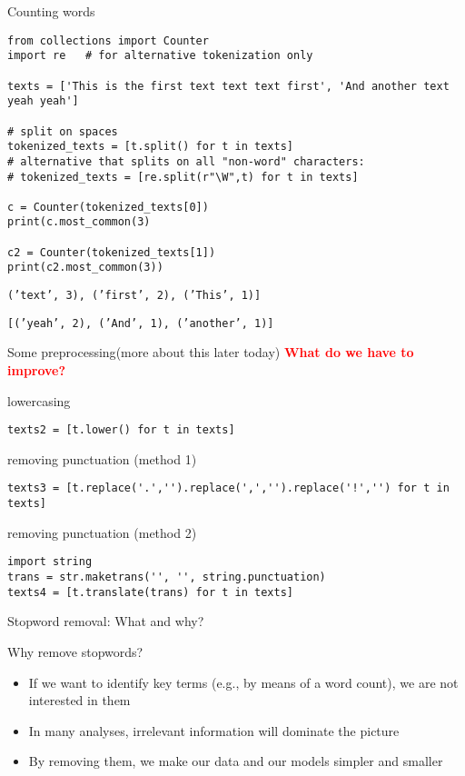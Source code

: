 \documentclass[compress]{beamer}
\begin{document}
\begin{frame}[fragile]{Counting words}
\begin{lstlisting}
from collections import Counter
import re   # for alternative tokenization only

texts = ['This is the first text text text first', 'And another text yeah yeah']

# split on spaces
tokenized_texts = [t.split() for t in texts] 
# alternative that splits on all "non-word" characters: 
# tokenized_texts = [re.split(r"\W",t) for t in texts] 

c = Counter(tokenized_texts[0]) 
print(c.most_common(3) 

c2 = Counter(tokenized_texts[1]) 
print(c2.most_common(3)) 

\end{lstlisting}

\texttt{('text', 3), ('first', 2), ('This', 1)]}

\texttt{[('yeah', 2), ('And', 1), ('another', 1)]}


\end{frame}


\begin{frame}[fragile]{Some preprocessing}{(more about this later today)}
\textbf{\textcolor{red}{What do we have to improve?}}
\pause


lowercasing
\begin{lstlisting}
texts2 = [t.lower() for t in texts]
\end{lstlisting}

removing punctuation (method 1)
\begin{lstlisting}
texts3 = [t.replace('.','').replace(',','').replace('!','') for t in texts]   
\end{lstlisting}

removing punctuation (method 2)
\begin{lstlisting}
import string
trans = str.maketrans('', '', string.punctuation)
texts4 = [t.translate(trans) for t in texts]   
\end{lstlisting}
\end{frame}





\begin{frame}{Stopword removal: What and why?}
\begin{block}{Why remove stopwords?}
\begin{itemize}
\item If we want to identify key terms (e.g., by means of a word count), we are not interested in them
\item In many analyses, irrelevant information will dominate the picture
\item By removing them, we make our data and our models simpler and smaller
\end{itemize}
\end{block}
\end{frame}
\end{document}
